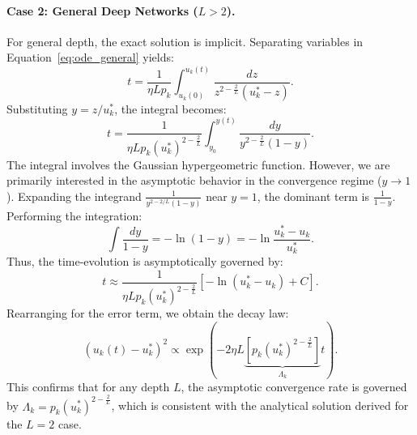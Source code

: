 \documentclass{article}
\theoremstyle{plain}
\theoremstyle{definition}
\theoremstyle{remark}
\begin{document}
\paragraph{Case 2: General Deep Networks ($L > 2$).}
For general depth, the exact solution is implicit. Separating variables in Equation~\eqref{eq:ode_general} yields:
\begin{equation*}
    t = \frac{1}{\eta L p_k} \int_{u_k(0)}^{u_k(t)} \frac{dz}{z^{2 - \frac{2}{L}} (u_k^* - z)}.
\end{equation*}
Substituting $y = z / u_k^*$, the integral becomes:
\begin{equation*}
    t = \frac{1}{\eta L p_k (u_k^*)^{2 - \frac{2}{L}}} \int_{y_0}^{y(t)} \frac{dy}{y^{2 - \frac{2}{L}} (1 - y)}.
\end{equation*}
The integral involves the Gaussian hypergeometric function. However, we are primarily interested in the asymptotic behavior in the convergence regime ($y \to 1$). Expanding the integrand $\frac{1}{y^{2 - 2/L} (1-y)}$ near $y=1$, the dominant term is $\frac{1}{1-y}$.
Performing the integration:
\begin{equation*}
    \int \frac{dy}{1-y} = -\ln(1-y) = -\ln \frac{u_k^* - u_k}{u_k^*}.
\end{equation*}
Thus, the time-evolution is asymptotically governed by:
\begin{equation*}
    t \approx \frac{1}{\eta L p_k (u_k^*)^{2 - \frac{2}{L}}} \left[ -\ln(u_k^* - u_k) + C \right].
\end{equation*}
Rearranging for the error term, we obtain the decay law:
\begin{equation}
    \label{eq:error_decay}
    (u_k(t) - u_k^*)^2 \propto \exp \left( - 2\eta L \underbrace{\left[ p_k (u_k^*)^{2 - \frac{2}{L}} \right]}_{\Lambda_k} t \right).
\end{equation}
This confirms that for any depth $L$, the asymptotic convergence rate is governed by $\Lambda_k = p_k (u_k^*)^{2 - \frac{2}{L}}$, which is consistent with the analytical solution derived for the $L=2$ case.
\end{document}
